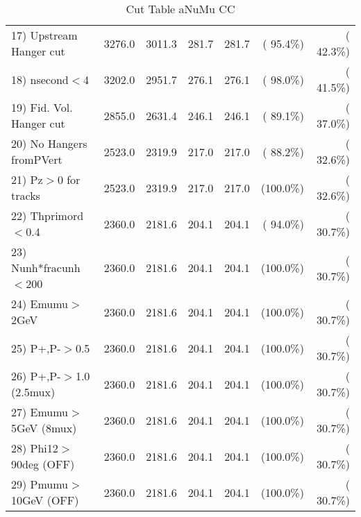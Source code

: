 \begin{table}[h!]
\begin{tabular}{||l||r|r|r|r|r|r||}
 17) Upstream Hanger cut  &       3276.0 &       3011.3 &        281.7 &        281.7 & ( 95.4\%) & ( 42.3\%) \\
 18) nsecond$<$4          &       3202.0 &       2951.7 &        276.1 &        276.1 & ( 98.0\%) & ( 41.5\%) \\
 19) Fid. Vol. Hanger cut &       2855.0 &       2631.4 &        246.1 &        246.1 & ( 89.1\%) & ( 37.0\%) \\
 20) No Hangers fromPVert &       2523.0 &       2319.9 &        217.0 &        217.0 & ( 88.2\%) & ( 32.6\%) \\
 21) Pz$>$0 for tracks    &       2523.0 &       2319.9 &        217.0 &        217.0 & (100.0\%) & ( 32.6\%) \\
 22) Thprimord$<$0.4      &       2360.0 &       2181.6 &        204.1 &        204.1 & ( 94.0\%) & ( 30.7\%) \\
 23) Nunh*fracunh$<$200   &       2360.0 &       2181.6 &        204.1 &        204.1 & (100.0\%) & ( 30.7\%) \\
 24) Emumu$>$2GeV         &       2360.0 &       2181.6 &        204.1 &        204.1 & (100.0\%) & ( 30.7\%) \\
 25) P+,P-$>$0.5          &       2360.0 &       2181.6 &        204.1 &        204.1 & (100.0\%) & ( 30.7\%) \\
 26) P+,P-$>$1.0 (2.5mux) &       2360.0 &       2181.6 &        204.1 &        204.1 & (100.0\%) & ( 30.7\%) \\
 27) Emumu$>$5GeV  (8mux) &       2360.0 &       2181.6 &        204.1 &        204.1 & (100.0\%) & ( 30.7\%) \\
 28) Phi12$>$90deg  (OFF) &       2360.0 &       2181.6 &        204.1 &        204.1 & (100.0\%) & ( 30.7\%) \\
 29) Pmumu$>$10GeV  (OFF) &       2360.0 &       2181.6 &        204.1 &        204.1 & (100.0\%) & ( 30.7\%) \\
 \hline
 \hline
 \end{tabular}
 \caption{Cut Table  aNuMu CC }
 \label{tab-cutcohjpsi-mumu_anumucc}
 \end{table}
